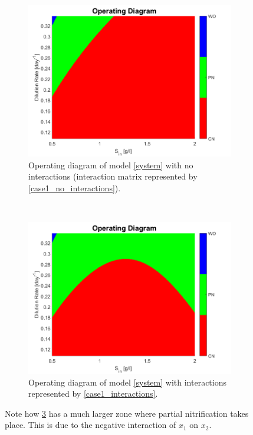 \documentclass[3p,times]{article}
\begin{document}
\begin{figure}[h]
	\centering
	\begin{subfigure}[b]{0.45\textwidth}
		\includegraphics[width = \textwidth]{Stability/OD_case_study_1_no_interactions}
		\caption{Operating diagram of model \eqref{system} with no interactions (interaction matrix represented by \eqref{case1_no_interactions}).}
		\label{OD_no_interactions}
	\end{subfigure}
~
	\begin{subfigure}[b]{0.45\textwidth}
	\includegraphics[width = \textwidth]{Stability/OD_case_study_1}
	\caption{Operating diagram of model \eqref{system} with interactions represented by \eqref{case1_interactions}.}
	\label{OD_interactions}
	\end{subfigure}
	\caption{Note how \ref{OD_interactions} has a much larger zone where partial nitrification takes place. This is due to the negative interaction of $x_1$ on $x_2$.}
\end{figure} 
\clearpage
\end{document}
